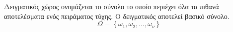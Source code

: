 Δειγματικός χώρος ονομάζεται το σύνολο το οποίο περιέχει όλα τα πιθανά αποτελέσματα ενός πειράματος τύχης. Ο δειγματικός αποτελεί βασικό σύνολο. \[ \varOmega=\left\lbrace \omega_1,\omega_2,\ldots,\omega_\nu \right\rbrace \]
